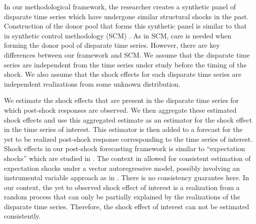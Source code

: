 \documentclass[11pt]{article}
\theoremstyle{definition}
\begin{document}
In our methodological framework, the researcher creates a synthetic panel of disparate time series which have undergone similar structural shocks in the past. Construction of the donor pool that forms this synthetic panel is similar to that in synthetic control methodology (SCM) \citep{abadie2010synthetic}. As in SCM, care is needed when forming the donor pool of disparate time series. However, there are key differences between our framework and SCM. We assume that the disparate time series are independent from the time series under study before the timing of the shock. We also assume that the shock effects for each disparate time series are independent realizations from some unknown distribution. 

We estimate the shock effects that are present in the disparate time series for which post-shock responses are observed. We then aggregate these estimated shock effects and use this aggregated estimate as an estimator for the shock effect in the time series of interest. This estimator is then added to a forecast for the yet to be realized post-shock response corresponding to the time series of interest. Shock effects in our post-shock forecasting framework is similar to ``expectation shocks'' which are studied in \cite{clements2019measuring}. The context in \cite{clements2019measuring} allowed for consistent estimation of expectation shocks under a vector autoregressive model, possibly involving an instrumental variable approach as in \cite{croushore2006data}. There is no consistency guarantee here. In our context, the yet to observed shock effect of interest is a realization from a random process that can only be partially explained by the realizations of the disparate time series. Therefore, the shock effect of interest can not be estimated consistently. 






\end{document}
